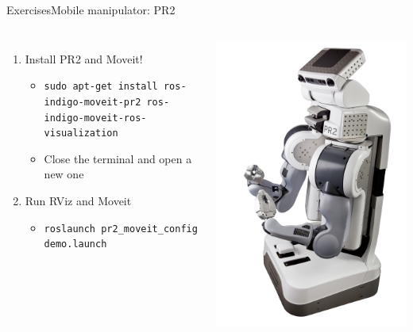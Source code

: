 \documentclass[10pt,compress]{beamer} %
\begin{document}
\begin{frame}{Exercises}{Mobile manipulator: PR2}
	\begin{columns}
		\begin{enumerate}
		\item Install PR2 and Moveit!
			\begin{itemize}
			\item \texttt{sudo apt-get install ros-indigo-moveit-pr2 ros-indigo-moveit-ros-visualization}
			\item Close the terminal and open a new one
			\end{itemize}
		\item Run RViz and Moveit
			\begin{itemize}
			\item \texttt{roslaunch pr2\_moveit\_config demo.launch}
			\end{itemize}
		\end{enumerate}
		\centering\includegraphics[width=0.9\linewidth]{figs/pr2.jpg}
	\end{columns}
\end{frame}
\end{document}
